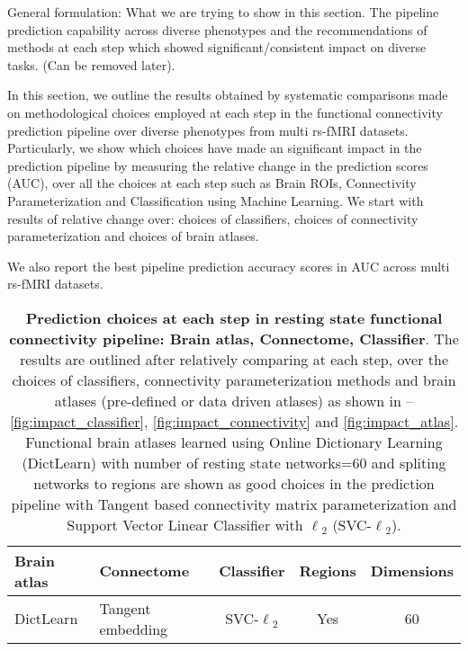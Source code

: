 \documentclass[5p]{elsarticle}
\begin{document}
General formulation: What we are trying to show in this section. The pipeline
prediction capability across diverse phenotypes and the recommendations of
methods at each step which showed significant/consistent impact on diverse
tasks. (Can be removed later).

In this section, we outline the results obtained by systematic comparisons
made on methodological choices employed at each step in the functional
connectivity prediction pipeline over diverse phenotypes from multi
rs-fMRI datasets.
Particularly, we show which choices have made an significant impact in the
prediction pipeline by measuring the relative change in the prediction
scores (AUC), over all the choices at each step such as Brain ROIs,
Connectivity Parameterization and Classification
using Machine Learning. We start with results of relative change over:
choices of classifiers, choices of connectivity parameterization and
choices of brain atlases.

We also report the best pipeline prediction accuracy scores in AUC across
multi rs-fMRI datasets.

\begin{table}[tb]
\small
\begin{tabularx}{\linewidth}{l|p{1.55cm}|c|c|c}
    \rowcolor{gray!50}
    Brain atlas  & Connectome & Classifier & Regions &
    Dimensions \\
    \hline
    DictLearn & Tangent embedding &  SVC-$\ell{_2}$ &  Yes & 60 \\
\end{tabularx}
    \caption{\textbf{
        Prediction choices at each step in resting state functional connectivity
        pipeline: Brain atlas, Connectome, Classifier}.
        The results are outlined after relatively comparing at each step, over the
        choices of classifiers, connectivity parameterization methods and brain
        atlases (pre-defined or data driven atlases) as shown in --
        \autoref{fig:impact_classifier}, \autoref{fig:impact_connectivity} and
        \autoref{fig:impact_atlas}. Functional brain atlases
        learned using Online Dictionary Learning (DictLearn) with
        number of resting state networks=$60$ and spliting networks to regions are
        shown as good choices in the prediction pipeline with Tangent based
        connectivity matrix parameterization and Support Vector Linear
        Classifier with $\ell{_2}$ (SVC-$\ell{_2}$).}
    \label{tab:pipeline}
\end{table}
\end{document}
